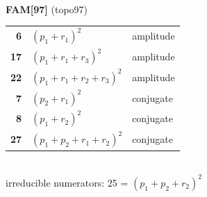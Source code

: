 \documentclass[10pt]{article}
\begin{document}
\begin{minipage}[t]{0.48\textwidth}
{}\\[2mm]\textbf{FAM[97]} (topo97)\\[2pt]{\footnotesize\begin{tabular}{@{}r@{\ \ }l@{\ \ }l@{}}\textbf{6} & $(p_1+r_1)^2$ & amplitude\\
\textbf{17} & $(p_1+r_1+r_3)^2$ & amplitude\\
\textbf{22} & $(p_1+r_1+r_2+r_3)^2$ & amplitude\\
\textbf{7} & $(p_2+r_1)^2$ & conjugate\\
\textbf{8} & $(p_1+r_2)^2$ & conjugate\\
\textbf{27} & $(p_1+p_2+r_1+r_2)^2$ & conjugate\\\end{tabular}}\\[2pt]{\scriptsize irreducible numerators: 25 = $(p_1+p_2+r_2)^2$}\end{minipage}\hfill%
\end{document}
